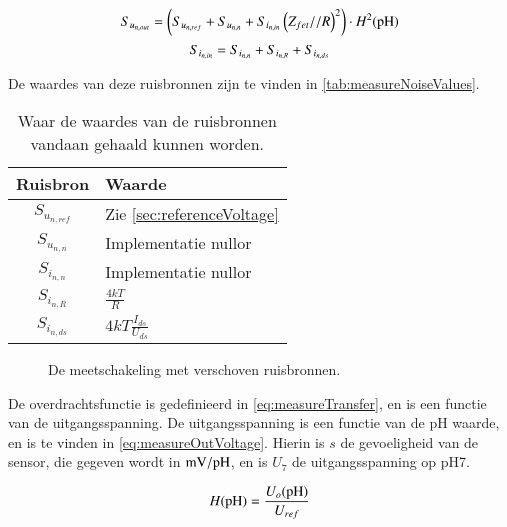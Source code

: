 \begin{equation}\label{eq:measureNoiseOut}
    S_{u_{{n,out}}} = \left(S_{u_{{n,ref}}} + S_{u_{{n,n}}} + S_{i_{{n,in}}}\left(Z_{fet} // R\right)^2\right) \cdot H^2(\ph)
    \tagaddtext{[\si{\volt\squared\per\hertz}]}
\end{equation}
\begin{equation}
    S_{i_{{n,in}}} = S_{i_{{n,n}}} + S_{i_{{n,R}}} + S_{i_{{n,ds}}}
    \tagaddtext{[\si{\ampere\squared\per\hertz}]}
    \label{eq:measureNoiseCurrentIn}
\end{equation}


De waardes van deze ruisbronnen zijn te vinden in \autoref{tab:measureNoiseValues}.

\begin{table}[ht]
    \centering
    \begin{tabular}{c|l}
        Ruisbron & Waarde \\
        \hline 
        $S_{u_{{n,ref}}}$ & Zie \autoref{sec:referenceVoltage} \\
        $S_{u_{{n,n}}}$   & Implementatie nullor \\
        $S_{i_{{n,n}}}$   & Implementatie nullor \\
        $S_{i_{{n,R}}}$   & $\frac{4kT}{R}$ \\
        $S_{i_{{n,ds}}}$  & $4kT\frac{I_{ds}}{U_{ds}}$ \\
    \end{tabular}
    \caption{Waar de waardes van de ruisbronnen vandaan gehaald kunnen worden.}
    \label{tab:measureNoiseValues}
\end{table}

\begin{figure}[ht]
    \centering
    \def\svgwidth{0.6\textwidth}
    
    \caption{De meetschakeling met verschoven ruisbronnen.}
    \label{fig:measureNoiseMoved}
\end{figure}

De overdrachtsfunctie is gedefinieerd in \autoref{eq:measureTransfer}, en is een functie van de uitgangsspanning. De uitgangsspanning is een functie van de pH waarde, en is te vinden in \autoref{eq:measureOutVoltage}. Hierin is $s$ de gevoeligheid van de sensor, die gegeven wordt in $\si{\milli\volt\per\ph}$, en is $U_7$ de uitgangsspanning op pH7.

\begin{equation}
    H(\ph) = \frac{U_o(\ph)}{U_{ref}}
    \label{eq:measureTransfer}
\end{equation}

